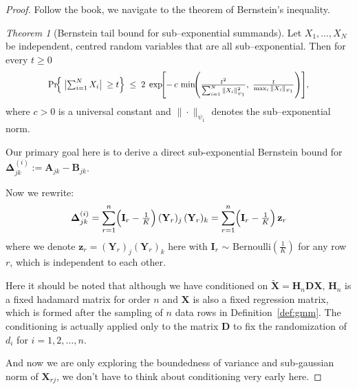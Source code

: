\documentclass[11pt]{article}
\numberwithin{equation}{section}
\theoremstyle{plain}
\theoremstyle{definition}
\theoremstyle{remark}
\newtheorem{thm}[theorem]{Theorem}
\begin{document}
\begin{proof}
Follow the book\cite{vershynin2018high}, we navigate to the theorem of Bernstein’s inequality.

\begin{thm}[Bernstein tail bound for sub–exponential summands]
  \label{thm:bernstein}
  Let \(X_{1},\dots ,X_{N}\) be independent, centred random variables that
  are all sub–exponential.  Then for every \(t\ge 0\)
  \[
  \scalebox{0.90}{$
  \Pr\!\Bigl\{\;\bigl|\textstyle\sum_{i=1}^{N} X_{i}\bigr|\;\ge t\Bigr\}
     \;\le\;
     2\;\exp\!\Biggl[
       -\,c\,
       \min\!\Biggl(
         \frac{t^{2}}{\sum_{i=1}^{N}\|X_{i}\|_{\psi_{1}}^{2}},
         \;
         \frac{t}{\max_{i}\|X_{i}\|_{\psi_{1}}}
       \Biggr)
     \Biggr],
  $}
  \]
  where \(c>0\) is a universal constant and
  \(\|\cdot\|_{\psi_{1}}\) denotes the sub–exponential norm.
  \end{thm}

Our primary goal here is to derive a 
direct sub-exponential Bernstein bound for $\mathbf{\Delta}_{jk}^{(i)} := \mathbf{A}_{jk} - \mathbf{B}_{jk}$.

Now we rewrite:
\[
  \mathbf{\Delta}_{jk}^{(i)} = \sum_{r=1}^{n}\Bigl(\mathbf{I}_{r}-\tfrac1K\Bigr)\,(\mathbf{Y}_{r})_{j}\,(\mathbf{Y}_{r})_{k} = \sum_{r=1}^{n}\Bigl(\mathbf{I}_{r}-\tfrac1K\Bigr)\, \mathbf{z}_r
\]
where we denote $\mathbf{z}_r=(\mathbf{Y}_{r})_{j}(\mathbf{Y}_{r})_{k}$ here
with $\mathbf{I}_r$ $\sim$ $\text{Bernoulli}(\frac{1}{K})$ for any row $r$, which is independent to each other.

Here it should be noted that although we have conditioned on \(\mathbf{\tilde{X}} = \mathbf{H}_{n}\mathbf{D}\mathbf{X}\),
$\mathbf{H}_{n}$ is a fixed hadamard matrix for order $n$ and $\mathbf{X}$ is also a fixed regression matrix, which is formed after the sampling of $n$ data rows in Definition~\ref{def:gmm}.
The conditioning is actually applied only to the matrix \(\mathbf{D}\) to fix the randomization of \(d_i\) for \(i = 1,2,\ldots,n\).

And now we are only exploring the boundedness of variance and sub-gaussian norm of $\mathbf{X}_{rj}$, we don't have to think about conditioning very early here.


\end{proof}
\end{document}
